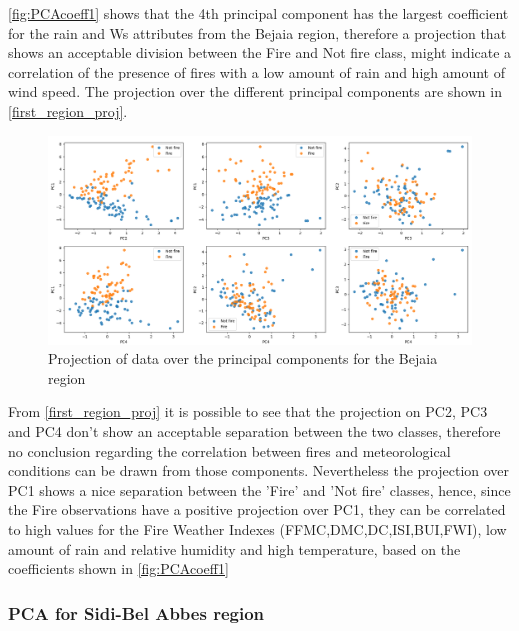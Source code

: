 \documentclass[10pt]{article}
\numberwithin{equation}{section}
\numberwithin{figure}{section}
\numberwithin{table}{section}
\begin{document}
\autoref{fig:PCAcoeff1} shows that the 4th principal component has the largest coefficient for the rain and Ws attributes from the Bejaia region, therefore a projection that shows an acceptable division between the Fire and Not fire class, might indicate a correlation of the presence of fires with a low amount of rain and high amount of wind speed. 
The projection over the different principal components are shown in \autoref{first_region_proj}.
\begin{figure}[H]
    \centering
    \includegraphics[width=\textwidth,height=\textheight,keepaspectratio]{Figures/projection PC first region.png}
    \caption{Projection of data over the principal components for the Bejaia region}
    \label{first_region_proj}
\end{figure}

From \autoref{first_region_proj} it is possible to see that the projection on PC2, PC3 and PC4 don't show an acceptable separation between the two classes, therefore no conclusion regarding the correlation between fires and meteorological conditions can be drawn from those components. Nevertheless the projection over PC1 shows a nice separation between the 'Fire' and 'Not fire' classes, hence, since the Fire observations have a positive projection over PC1, they can be correlated to high values for the Fire Weather Indexes (FFMC,DMC,DC,ISI,BUI,FWI), low amount of rain and relative humidity and high temperature, based on the coefficients shown in \autoref{fig:PCAcoeff1}







\subsubsection{PCA for Sidi-Bel Abbes region}
\end{document}
